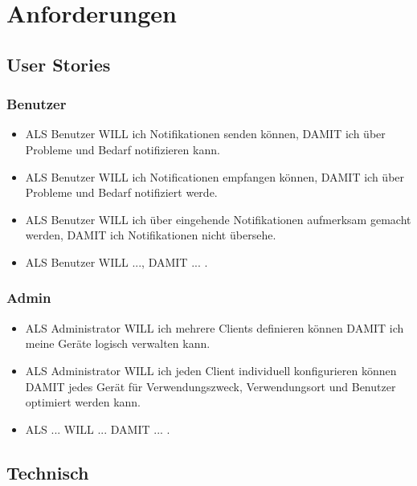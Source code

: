 \section{Anforderungen}

\subsection{User Stories}

    \subsubsection*{Benutzer}

        \begin{itemize}
            \item ALS Benutzer WILL ich Notifikationen senden können, DAMIT ich über Probleme und Bedarf notifizieren kann.    
            \item ALS Benutzer WILL ich Notificationen empfangen können, DAMIT ich über Probleme und Bedarf notifiziert werde.   
            \item ALS Benutzer WILL ich über eingehende Notifikationen aufmerksam gemacht werden, DAMIT ich Notifikationen nicht übersehe.   
            \item ALS Benutzer WILL ..., DAMIT ... .   
        \end{itemize}



    \subsubsection*{Admin}

    \begin{itemize}
        \item ALS Administrator WILL ich mehrere Clients definieren können DAMIT ich meine Geräte logisch verwalten kann. 
        \item ALS Administrator WILL ich jeden Client individuell konfigurieren können DAMIT jedes Gerät für Verwendungszweck, Verwendungsort und Benutzer optimiert werden kann. 
        \item ALS ... WILL ... DAMIT ... . 
    \end{itemize}



\subsection{Technisch}

